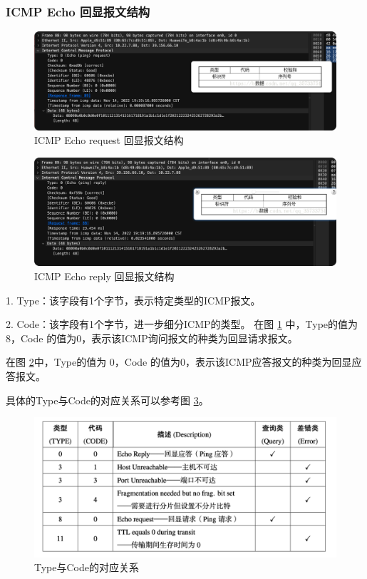\documentclass[a4paper,12pt]{report}
\begin{document}
\begin{spacing}{1.5}
\subsubsection{ICMP Echo 回显报文结构}
\begin{figure}[htb!]
  \centering
\includegraphics[width=12cm]{figure/echo_request.png}
  \caption{ICMP Echo request 回显报文结构}
  \label{fig:echo_request}
\end{figure}
\begin{figure}[htb!]
  \centering
\includegraphics[width=12cm]{figure/echo_reply.png}
  \caption{ICMP Echo reply 回显报文结构}
  \label{fig:echo_reply}
\end{figure}

1. Type：该字段有1个字节，表示特定类型的ICMP报文。

2. Code：该字段有1个字节，进一步细分ICMP的类型。
在图 \ref{fig:echo_request} 中，Type的值为 8，Code 的值为0，表示该ICMP询问报文的种类为回显请求报文。

在图 \ref{fig:echo_reply}中，Type的值为 0，Code 的值为0，表示该ICMP应答报文的种类为回显应答报文。

具体的Type与Code的对应关系可以参考图 \ref{fig:TC}。

\begin{figure}[htb!]
  \centering
\includegraphics[width=12cm]{figure/TC.png}
  \caption{Type与Code的对应关系}
  \label{fig:TC}
\end{figure}


\end{spacing}
\end{document}
